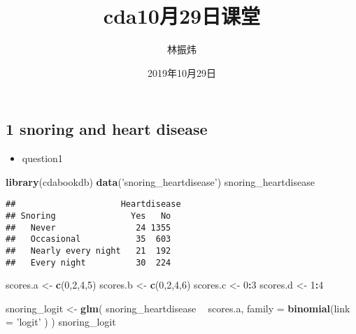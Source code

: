 \documentclass[12pt,hyperref,]{ctexart}
\title{cda10月29日课堂}
\author{林振炜}
\date{2019年10月29日}
\newenvironment{Shaded}{\begin{snugshade}}{\end{snugshade}}
\newcommand{\DataTypeTok}[1]{\textcolor[rgb]{0.13,0.29,0.53}{#1}}
\newcommand{\DecValTok}[1]{\textcolor[rgb]{0.00,0.00,0.81}{#1}}
\newcommand{\KeywordTok}[1]{\textcolor[rgb]{0.13,0.29,0.53}{\textbf{#1}}}
\newcommand{\NormalTok}[1]{#1}
\newcommand{\OperatorTok}[1]{\textcolor[rgb]{0.81,0.36,0.00}{\textbf{#1}}}
\newcommand{\StringTok}[1]{\textcolor[rgb]{0.31,0.60,0.02}{#1}}
\providecommand{\tightlist}{%
  \setlength{\itemsep}{0pt}\setlength{\parskip}{0pt}}
\begin{document}
\maketitle

\hypertarget{snoring-and-heart-disease}{%
\subsection{1 snoring and heart
disease}\label{snoring-and-heart-disease}}

\begin{itemize}
\tightlist
\item
  question1
\end{itemize}

\begin{Shaded}
\begin{Highlighting}[]
\KeywordTok{library}\NormalTok{(cdabookdb)}
\KeywordTok{data}\NormalTok{(}\StringTok{'snoring_heartdisease'}\NormalTok{)}
\NormalTok{snoring_heartdisease}
\end{Highlighting}
\end{Shaded}

\begin{verbatim}
##                     Heartdisease
## Snoring               Yes   No
##   Never                24 1355
##   Occasional           35  603
##   Nearly every night   21  192
##   Every night          30  224
\end{verbatim}

\begin{Shaded}
\begin{Highlighting}[]
\NormalTok{scores.a <-}\StringTok{ }\KeywordTok{c}\NormalTok{(}\DecValTok{0}\NormalTok{,}\DecValTok{2}\NormalTok{,}\DecValTok{4}\NormalTok{,}\DecValTok{5}\NormalTok{)}
\NormalTok{scores.b <-}\StringTok{ }\KeywordTok{c}\NormalTok{(}\DecValTok{0}\NormalTok{,}\DecValTok{2}\NormalTok{,}\DecValTok{4}\NormalTok{,}\DecValTok{6}\NormalTok{)}
\NormalTok{scores.c <-}\StringTok{ }\DecValTok{0}\OperatorTok{:}\DecValTok{3}
\NormalTok{scores.d <-}\StringTok{ }\DecValTok{1}\OperatorTok{:}\DecValTok{4}

\NormalTok{snoring_logit <-}\StringTok{ }\KeywordTok{glm}\NormalTok{(}
\NormalTok{  snoring_heartdisease }\OperatorTok{~}\StringTok{ }\NormalTok{scores.a, }\DataTypeTok{family =} \KeywordTok{binomial}\NormalTok{(}\DataTypeTok{link =} \StringTok{'logit'}\NormalTok{ )}
\NormalTok{)}
\NormalTok{snoring_logit}
\end{Highlighting}
\end{Shaded}
\end{document}
